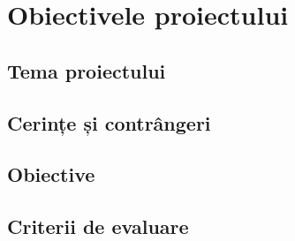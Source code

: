 \chapter{Obiectivele proiectului}\label{ch:obiective}
\pagestyle{fancy}

\section{Tema proiectului}

\section{Cerințe și contrângeri}

\section{Obiective}

\section{Criterii de evaluare}

